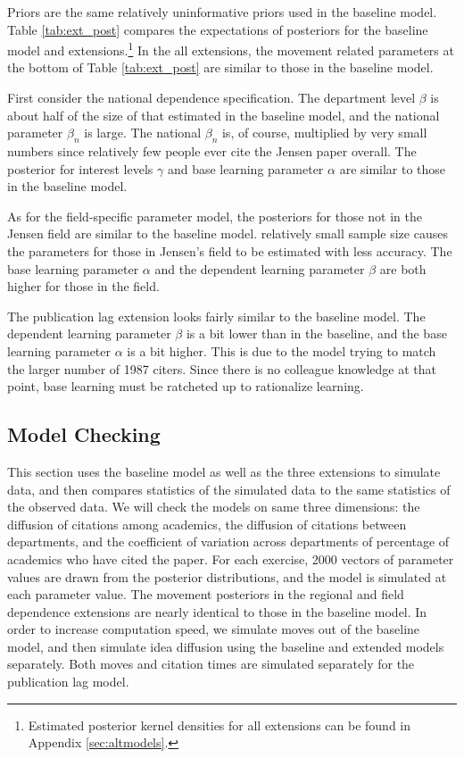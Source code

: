 \documentclass[]{article}
\begin{document}
Priors are the same relatively uninformative priors used in the baseline model.  Table \ref{tab:ext_post} compares the expectations of posteriors for the baseline model and extensions.\footnote{Estimated posterior kernel densities 
    for all extensions can be found in Appendix \ref{sec:altmodels}.}
In the all extensions, the movement related parameters at the bottom of Table \ref{tab:ext_post} are
similar to those in the baseline model.

First consider the national dependence specification.
The department level $\beta$ is about half of the size of that
estimated in the baseline model, and the national parameter $\beta_n$ is large.
The national $\beta_n$ is, of course, multiplied by very small numbers since relatively few people ever
cite the Jensen paper overall.  The posterior for interest levels $\gamma$ and base learning parameter
$\alpha$ are similar to those in the baseline model.

As for the field-specific parameter model, the posteriors for those
not in the Jensen field are similar to the baseline model. 
relatively small sample size causes the
parameters for those in Jensen's field to be estimated with less
accuracy. The base learning parameter
$\alpha$ and the dependent learning parameter $\beta$  are both higher for those in the field.

The publication lag extension looks fairly similar to the baseline model.  The dependent learning parameter $\beta$ is a bit lower than in the baseline, and the base learning parameter  $\alpha$ is a bit higher.  This is due to the model trying to match the larger number of 1987 citers.  Since there is no colleague knowledge at that point, base learning must be ratcheted up to rationalize learning.

\subsection{Model Checking}
\label{sec:modcheck}

This section uses the baseline model as well as the three extensions to
simulate data, and then compares statistics of the simulated data to
the same statistics of the observed data. We will check the models on same
three dimensions: the diffusion of citations among academics, the
diffusion of citations between departments, and the coefficient of
variation across departments of percentage of academics who have cited the
paper. For each exercise, 2000 vectors of parameter values are drawn
from the posterior distributions, and the model is simulated at each parameter value.
The movement posteriors in the regional and field dependence extensions are
nearly identical to those in the baseline model.
In order to increase computation speed, we simulate moves out of the
baseline model, and then simulate idea diffusion using the baseline and extended
models separately.  Both moves and citation times are simulated separately for
the publication lag model.
\end{document}
